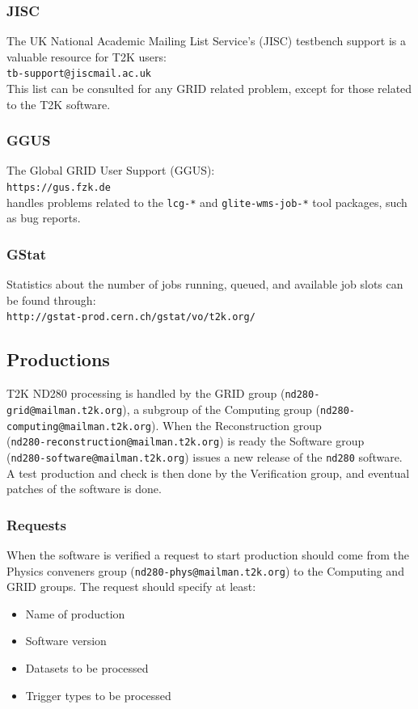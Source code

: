 \documentclass[11pt]{article}
\begin{document}
\subsubsection*{JISC}
The UK National Academic Mailing List Service's (JISC) \cite{jisc} testbench support is a valuable resource for T2K users:\\
\verb+tb-support@jiscmail.ac.uk+\\
This list can be consulted for any GRID related problem, except for those related to the T2K software.

\subsubsection*{GGUS}
The Global GRID User Support (GGUS):\\
\verb+https://gus.fzk.de+\\
handles problems related to the \verb+lcg-*+ and \verb+glite-wms-job-*+ tool packages, such as bug reports.

\subsubsection*{GStat}
Statistics about the number of jobs running, queued, and available job slots can be found through:\\
\verb+http://gstat-prod.cern.ch/gstat/vo/t2k.org/+


\subsection{Productions}
T2K ND280 processing is handled by the GRID group
(\verb+nd280-grid@mailman.t2k.org+), a subgroup of the Computing group
(\verb+nd280-computing@mailman.t2k.org+). When the Reconstruction
group\\ (\verb+nd280-reconstruction@mailman.t2k.org+) is ready the
Software group\\ (\verb+nd280-software@mailman.t2k.org+) issues a new
release of the \verb+nd280+ software. A test production and check is
then done by the Verification group, and eventual patches of the
software is done.

\subsubsection*{Requests}
When the software is verified a request to start production should
come from the Physics conveners group
(\verb+nd280-phys@mailman.t2k.org+) to the Computing and GRID
groups. The request should specify at least:
\begin{itemize}
\item Name of production
\item Software version
\item Datasets to be processed
\item Trigger types to be processed
\end{itemize}
\end{document}
